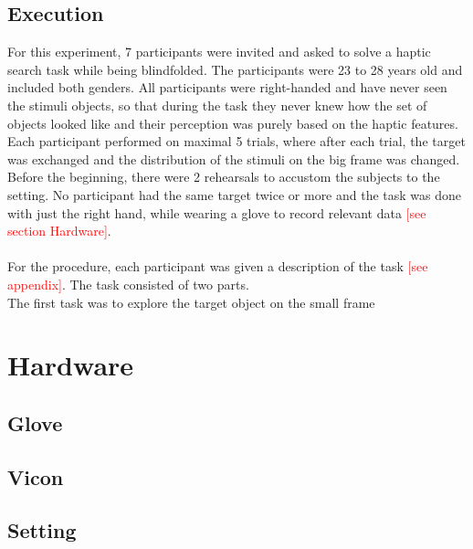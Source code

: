 \subsection{Execution}  
For this experiment, 7 participants were invited and asked to solve a haptic search task while being blindfolded. The participants were 23 to 28 years old and included both genders. All participants were right-handed and have never seen the stimuli objects, so that during the task they never knew how the set of objects looked like and their perception was purely based on the haptic features.\\
Each participant performed on maximal 5 trials, where after each trial, the target was exchanged and the distribution of the stimuli on the big frame was changed. Before the beginning, there were 2 rehearsals to accustom the subjects to the setting. No participant had the same target twice or more and the task was done with just the right hand, while wearing a glove to record relevant data \textcolor{red}{[see section Hardware]}.\\
\\
For the procedure, each participant was given a description of the task \textcolor{red}{[see appendix]}. The task consisted of two parts. \\
The first task was to explore the target object on the small frame
\section{Hardware}

\subsection{Glove}
\subsection{Vicon}
\subsection{Setting}